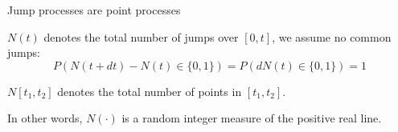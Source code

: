 \documentclass[
  ignorenonframetext,
  aspectratio=169,
  xcolor={dvipsnames,rgb}
]{beamer}
\begin{document}
\begin{frame}{Jump processes are point processes}


\( N (t) \) denotes the total number of jumps over \( [0, t] \), we assume no common jumps:
\[
  P(N(t + dt) - N(t) \in \{ 0, 1 \}) = P( dN(t) \in \{ 0, 1 \}) = 1
\]

\vspace{5em}

\( N[t_1, t_2] \) denotes the total number of points in \( [t_1, t_2] \). 

\vspace{1em}

In other words, \( N( \cdot ) \) is a random integer measure of the positive real line. 

\end{frame}







\end{document}
